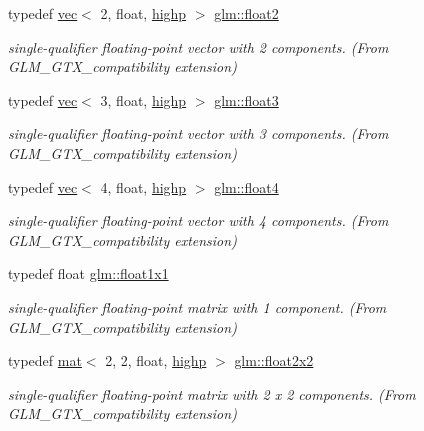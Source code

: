 \begin{DoxyCompactItemize}
typedef \hyperlink{structglm_1_1vec}{vec}$<$ 2, float, \hyperlink{namespaceglm_a36ed105b07c7746804d7fdc7cc90ff25ac6f7eab42eacbb10d59a58e95e362074}{highp} $>$ \hyperlink{group__gtx__compatibility_gaba973334bf704aa382f9b0dc06b59cf8}{glm\+::float2}
\begin{DoxyCompactList}\small\item\em single-\/qualifier floating-\/point vector with 2 components. (From G\+L\+M\+\_\+\+G\+T\+X\+\_\+compatibility extension) \end{DoxyCompactList}\item 
typedef \hyperlink{structglm_1_1vec}{vec}$<$ 3, float, \hyperlink{namespaceglm_a36ed105b07c7746804d7fdc7cc90ff25ac6f7eab42eacbb10d59a58e95e362074}{highp} $>$ \hyperlink{group__gtx__compatibility_ga8bbd0db121b50b0904f9a23adb3bbc45}{glm\+::float3}
\begin{DoxyCompactList}\small\item\em single-\/qualifier floating-\/point vector with 3 components. (From G\+L\+M\+\_\+\+G\+T\+X\+\_\+compatibility extension) \end{DoxyCompactList}\item 
typedef \hyperlink{structglm_1_1vec}{vec}$<$ 4, float, \hyperlink{namespaceglm_a36ed105b07c7746804d7fdc7cc90ff25ac6f7eab42eacbb10d59a58e95e362074}{highp} $>$ \hyperlink{group__gtx__compatibility_ga5b28e8af9bfee363940882dd7d1214b5}{glm\+::float4}
\begin{DoxyCompactList}\small\item\em single-\/qualifier floating-\/point vector with 4 components. (From G\+L\+M\+\_\+\+G\+T\+X\+\_\+compatibility extension) \end{DoxyCompactList}\item 
typedef float \hyperlink{group__gtx__compatibility_gaac1faa940ac1fbb32d4a315005b578af}{glm\+::float1x1}
\begin{DoxyCompactList}\small\item\em single-\/qualifier floating-\/point matrix with 1 component. (From G\+L\+M\+\_\+\+G\+T\+X\+\_\+compatibility extension) \end{DoxyCompactList}\item 
typedef \hyperlink{structglm_1_1mat}{mat}$<$ 2, 2, float, \hyperlink{namespaceglm_a36ed105b07c7746804d7fdc7cc90ff25ac6f7eab42eacbb10d59a58e95e362074}{highp} $>$ \hyperlink{group__gtx__compatibility_gab3fb1cd56ec3f5407a4d3b9173bd88ae}{glm\+::float2x2}
\begin{DoxyCompactList}\small\item\em single-\/qualifier floating-\/point matrix with 2 x 2 components. (From G\+L\+M\+\_\+\+G\+T\+X\+\_\+compatibility extension) \end{DoxyCompactList}\item 

\end{DoxyCompactItemize}
